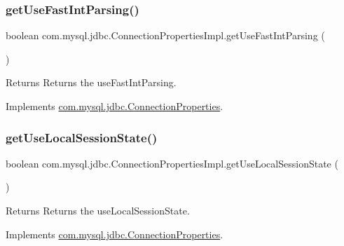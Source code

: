 \subsubsection{\texorpdfstring{get\+Use\+Fast\+Int\+Parsing()}{getUseFastIntParsing()}}
{\footnotesize\ttfamily boolean com.\+mysql.\+jdbc.\+Connection\+Properties\+Impl.\+get\+Use\+Fast\+Int\+Parsing (\begin{DoxyParamCaption}{ }\end{DoxyParamCaption})}

\begin{DoxyReturn}{Returns}
Returns the use\+Fast\+Int\+Parsing. 
\end{DoxyReturn}


Implements \mbox{\hyperlink{interfacecom_1_1mysql_1_1jdbc_1_1_connection_properties_af48fc4f6629e4ada4cf9bc8668207e1c}{com.\+mysql.\+jdbc.\+Connection\+Properties}}.

\mbox{\label{classcom_1_1mysql_1_1jdbc_1_1_connection_properties_impl_aeb5f62adfbde0b6fcd7b43565abb6ed5}} 
\subsubsection{\texorpdfstring{get\+Use\+Local\+Session\+State()}{getUseLocalSessionState()}}
{\footnotesize\ttfamily boolean com.\+mysql.\+jdbc.\+Connection\+Properties\+Impl.\+get\+Use\+Local\+Session\+State (\begin{DoxyParamCaption}{ }\end{DoxyParamCaption})}

\begin{DoxyReturn}{Returns}
Returns the use\+Local\+Session\+State. 
\end{DoxyReturn}


Implements \mbox{\hyperlink{interfacecom_1_1mysql_1_1jdbc_1_1_connection_properties_a415c18a036cfda4e12ac4c6952a303b1}{com.\+mysql.\+jdbc.\+Connection\+Properties}}.

